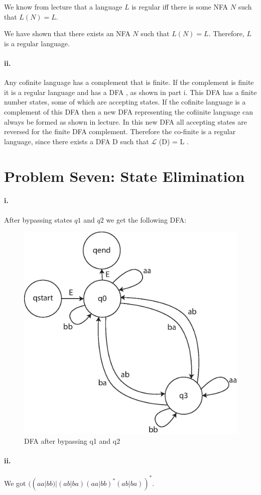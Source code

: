 \documentclass[10pt,letter]{article}
\begin{document}
We know from lecture that a language $L$ is regular iff there is some NFA $N$ such that $L(N) = L$.

We have shown that there exists an NFA $N$ such that $L(N) = L$. Therefore, $L$ is a regular language.

\paragraph{ii.} Any cofinite language has a complement that is finite. If the complement is finite it is a regular language and has a DFA , as shown in part i. This DFA has a finite number states, some of which are accepting states. If the cofinite language is a complement of this DFA then a new DFA representing the cofiinite language can always be formed as shown in lecture.  In this new DFA all accepting states are reversed for the finite DFA complement. Therefore the co-finite is a regular language, since there exists a DFA D such that $\mathscr{L}$ (D) = L . 

\section*{Problem Seven: State Elimination}

\paragraph{i.} After bypassing states $q1$ and $q2$ we get the following DFA:\\

\begin{figure}[h]
\centering
  \includegraphics[width=0.45\linewidth]{7i.eps}
  \caption{DFA after bypassing q1 and q2}
  \label{fig:7i}
\end{figure}

\paragraph{ii.} We got $( (aa|bb) | (ab|ba) (aa|bb)^{*} (ab|ba))^{*}$.
\end{document}
